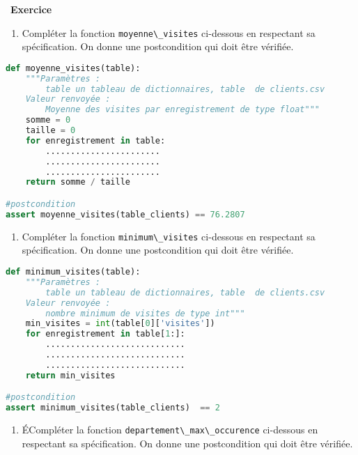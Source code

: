 \documentclass[
  11pt,
]{article}
\newcommand{\passthrough}[1]{#1}
\providecommand{\tightlist}{%
  \setlength{\itemsep}{0pt}\setlength{\parskip}{0pt}}
\newcounter{exo}
\newenvironment{exercice}[1]
{\par \medskip   \addtocounter{exo}{1} \noindent  
\begin{bclogo}[arrondi =0.1,   noborder = true, logo=\bccrayon, marge=4]{~\textbf{Exercice} \textbf{\theexo} {\itshape #1} }  \par}
{
\end{bclogo}
 \par \bigskip }
\newcounter{def}
\begin{document}
\begin{exercice}{}
\begin{enumerate}
\def\labelenumi{\arabic{enumi}.}
\setcounter{enumi}{2}
\tightlist
\item
  Compléter la fonction \passthrough{\lstinline!moyenne\_visites!}
  ci-dessous en respectant sa spécification. On donne une postcondition
  qui doit être vérifiée.
\end{enumerate}

\begin{lstlisting}[language=Python]
def moyenne_visites(table):
    """Paramètres : 
        table un tableau de dictionnaires, table  de clients.csv
    Valeur renvoyée :
        Moyenne des visites par enregistrement de type float"""
    somme = 0
    taille = 0
    for enregistrement in table:
        .......................
        .......................
        .......................
    return somme / taille

#postcondition
assert moyenne_visites(table_clients) == 76.2807 
\end{lstlisting}

\begin{enumerate}
\def\labelenumi{\arabic{enumi}.}
\setcounter{enumi}{3}
\tightlist
\item
  Compléter la fonction \passthrough{\lstinline!minimum\_visites!}
  ci-dessous en respectant sa spécification. On donne une postcondition
  qui doit être vérifiée.
\end{enumerate}

\begin{lstlisting}[language=Python]
def minimum_visites(table):
    """Paramètres : 
        table un tableau de dictionnaires, table  de clients.csv
    Valeur renvoyée :
        nombre minimum de visites de type int"""    
    min_visites = int(table[0]['visites'])
    for enregistrement in table[1:]:
        ............................
        ............................
        ............................
    return min_visites

#postcondition
assert minimum_visites(table_clients)  == 2
\end{lstlisting}

\begin{enumerate}
\def\labelenumi{\arabic{enumi}.}
\setcounter{enumi}{4}
\tightlist
\item
  ÉCompléter la fonction
  \passthrough{\lstinline!departement\_max\_occurence!} ci-dessous en
  respectant sa spécification. On donne une postcondition qui doit être
  vérifiée.
\end{enumerate}


\end{exercice}
\end{document}
